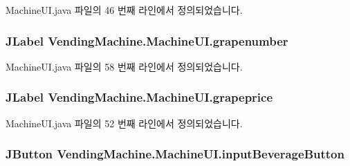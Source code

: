 Machine\+U\+I.\+java 파일의 46 번째 라인에서 정의되었습니다.

\subsubsection[{\texorpdfstring{grapenumber}{grapenumber}}]{\setlength{\rightskip}{0pt plus 5cm}J\+Label Vending\+Machine.\+Machine\+U\+I.\+grapenumber\hspace{0.3cm}{\ttfamily [private]}}\hypertarget{class_vending_machine_1_1_machine_u_i_a49996fe3818b6587f54e105c41c2f0b1}{}\label{class_vending_machine_1_1_machine_u_i_a49996fe3818b6587f54e105c41c2f0b1}


Machine\+U\+I.\+java 파일의 58 번째 라인에서 정의되었습니다.

\subsubsection[{\texorpdfstring{grapeprice}{grapeprice}}]{\setlength{\rightskip}{0pt plus 5cm}J\+Label Vending\+Machine.\+Machine\+U\+I.\+grapeprice\hspace{0.3cm}{\ttfamily [private]}}\hypertarget{class_vending_machine_1_1_machine_u_i_ab18de7006b9426b82266463a305ff30e}{}\label{class_vending_machine_1_1_machine_u_i_ab18de7006b9426b82266463a305ff30e}


Machine\+U\+I.\+java 파일의 52 번째 라인에서 정의되었습니다.

\subsubsection[{\texorpdfstring{input\+Beverage\+Button}{inputBeverageButton}}]{\setlength{\rightskip}{0pt plus 5cm}J\+Button Vending\+Machine.\+Machine\+U\+I.\+input\+Beverage\+Button\hspace{0.3cm}{\ttfamily [private]}}\hypertarget{class_vending_machine_1_1_machine_u_i_a1f437e079f7a931ee649ac03540d5f49}{}\label{class_vending_machine_1_1_machine_u_i_a1f437e079f7a931ee649ac03540d5f49}


